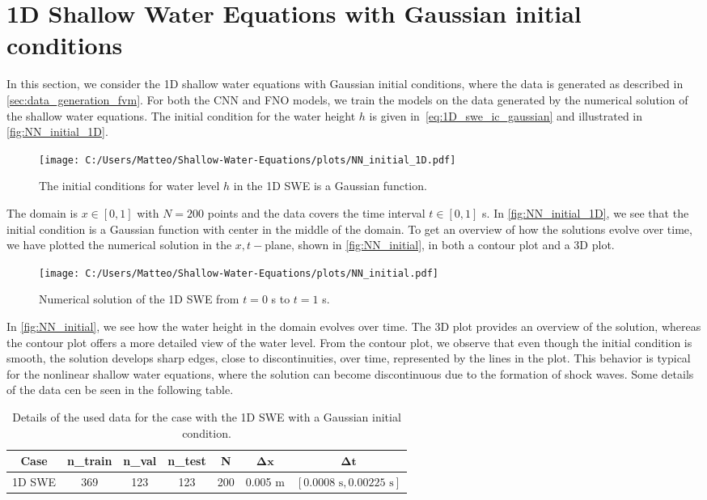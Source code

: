 \section{1D Shallow Water Equations with Gaussian initial conditions}
In this section, we consider the 1D shallow water equations with Gaussian initial conditions, where the data is generated as described in \autoref{sec:data_generation_fvm}.
For both the CNN and FNO models, we train the models on the data generated by the numerical solution of the shallow water equations.
The initial condition for the water height $h$ is given in~\eqref{eq:1D_swe_ic_gaussian} and illustrated in \autoref{fig:NN_initial_1D}.
\begin{figure}[H]
    \centering
    \texttt{[image: C:/Users/Matteo/Shallow-Water-Equations/plots/NN\_initial\_1D.pdf]}
    \caption{The initial conditions for water level $h$ in the 1D SWE is a Gaussian function.}\label{fig:NN_initial_1D}
\end{figure}
The domain is $ x \in [0, 1]$ with $N = 200$ points and the data covers the time interval $t \in [0, 1]$ s.
In \autoref{fig:NN_initial_1D}, we see that the initial condition is a Gaussian function with center in the middle of the domain.
To get an overview of how the solutions evolve over time, we have plotted the numerical solution in the $x,t-$plane, shown in \autoref{fig:NN_initial}, in both a contour plot and a 3D plot.
\begin{figure}[H]
    \hspace{1.7cm} %
    \texttt{[image: C:/Users/Matteo/Shallow-Water-Equations/plots/NN\_initial.pdf]}
    \caption{Numerical solution of the 1D SWE from $t = 0$ s to $t = 1$ s.}\label{fig:NN_initial}
\end{figure}
In \autoref{fig:NN_initial}, we see how the water height in the domain evolves over time.
The 3D plot provides an overview of the solution, whereas the contour plot offers a more detailed view of the water level.
From the contour plot, we observe that even though the initial condition is smooth, the solution develops sharp edges, close to discontinuities, over time, represented by the lines in the plot.
This behavior is typical for the nonlinear shallow water equations, where the solution can become discontinuous due to the formation of shock waves.
Some details of the data cen be seen in the following table.
\begin{table}[H]
    \centering
    \begin{tabular}{c|cccccc}
        \textbf{Case} & \textbf{n\_train} & \textbf{n\_val} & \textbf{n\_test} & \textbf{N} & $\mathbf{\Delta x}$ & $\mathbf{\Delta t}$ \\
        \hline
        1D SWE & 369 & 123 & 123 & 200 & 0.005 m & $[0.0008 \text{ s}, 0.00225 \text{ s}]$ \\
    \end{tabular}
    \caption{Details of the used data for the case with the 1D SWE with a Gaussian initial condition.}\label{tab:cnn_data}
\end{table}
